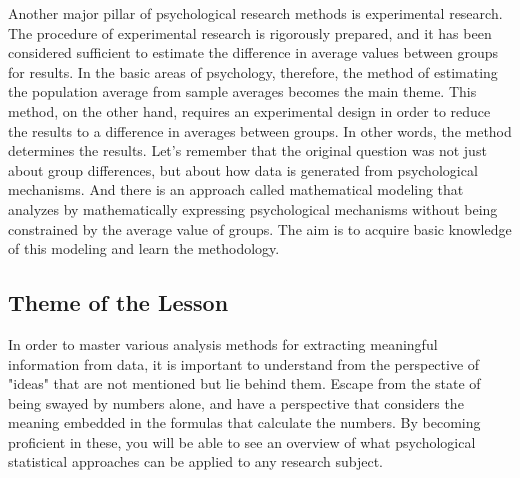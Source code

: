 Another major pillar of psychological research methods is experimental research. The procedure of experimental research is rigorously prepared, and it has been considered sufficient to estimate the difference in average values between groups for results. In the basic areas of psychology, therefore, the method of estimating the population average from sample averages becomes the main theme. This method, on the other hand, requires an experimental design in order to reduce the results to a difference in averages between groups. In other words, the method determines the results. Let's remember that the original question was not just about group differences, but about how data is generated from psychological mechanisms. And there is an approach called mathematical modeling that analyzes by mathematically expressing psychological mechanisms without being constrained by the average value of groups. The aim is to acquire basic knowledge of this modeling and learn the methodology.

\subsection*{Theme of the Lesson}
In order to master various analysis methods for extracting meaningful information from data, it is important to understand from the perspective of "ideas" that are not mentioned but lie behind them.
Escape from the state of being swayed by numbers alone, and have a perspective that considers the meaning embedded in the formulas that calculate the numbers.
By becoming proficient in these, you will be able to see an overview of what psychological statistical approaches can be applied to any research subject.

